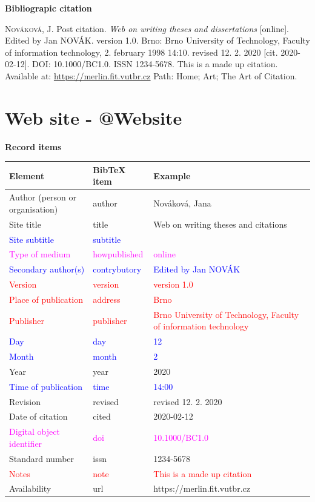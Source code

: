 \bigskip

\noindent \textbf{Bibliograpic citation}

\medskip

\noindent \textsc{Nováková}, J. Post citation. \textit{Web on writing theses and dissertations} [online]. Edited by Jan NOVÁK. version 1.0. Brno: Brno University of Technology, Faculty of information technology, 2. february 1998 14:10. revised 12. 2. 2020 [cit. 2020-02-12]. DOI: 10.1000/BC1.0. ISSN 1234-5678. This is a made up citation. Available at: \url{https://merlin.fit.vutbr.cz} Path: Home; Art; The Art of Citation.
\newpage
\section*{Web site - @Website}
\label{pr-website}
\noindent \textbf{Record items}

\medskip

\begin{tabularx}{\linewidth}{X X X}
    Element & BibTeX item & Example\\\hline
    Author (person or organisation) & author & Nováková, Jana\\
    Site title & title & Web on writing theses and citations\\
    \textcolor{blue}{Site subtitle} &  \textcolor{blue}{subtitle} & \\
    \textcolor{magenta}{Type of medium} & \textcolor{magenta}{howpublished} & \textcolor{magenta}{online}\\
    \textcolor{blue}{Secondary author(s)} & \textcolor{blue}{contrybutory} & \textcolor{blue}{Edited by Jan NOVÁK}\\
    \textcolor{red}{Version} & \textcolor{red}{version} & \textcolor{red}{version 1.0}\\
    \textcolor{red}{Place of publication} & \textcolor{red}{address} & \textcolor{red}{Brno}\\
    \textcolor{red}{Publisher} & \textcolor{red}{publisher} & \textcolor{red}{Brno University of Technology, Faculty of information technology}\\
    \textcolor{blue}{Day} & \textcolor{blue}{day} & \textcolor{blue}{12}\\
    \textcolor{blue}{Month} & \textcolor{blue}{month} & \textcolor{blue}{2}\\
    Year & year & 2020\\
    \textcolor{blue}{Time of publication} & \textcolor{blue}{time} & \textcolor{blue}{14:00}\\
    Revision & revised & revised 12. 2. 2020\\
    Date of citation & cited & 2020-02-12\\
    \textcolor{magenta}{Digital object identifier} & \textcolor{magenta}{doi} & \textcolor{magenta}{10.1000/BC1.0}\\
    Standard number & issn & 1234-5678\\
    \textcolor{red}{Notes} & \textcolor{red}{note} & \textcolor{red}{This is a made up citation}\\
    Availability & url & https://merlin.fit.vutbr.cz
\end{tabularx}

